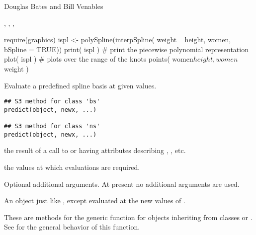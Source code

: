 %
\begin{Author}\relax
Douglas Bates and Bill Venables
\end{Author}
%
\begin{SeeAlso}\relax
{},
,
,
\end{SeeAlso}
%
\begin{Examples}
\begin{ExampleCode}
require(graphics)
ispl <- polySpline(interpSpline( weight ~ height,  women, bSpline = TRUE))
print( ispl )   # print the piecewise polynomial representation
plot( ispl )    # plots over the range of the knots
points( women$height, women$weight )
\end{ExampleCode}
\end{Examples}
%
\begin{Description}\relax
Evaluate a predefined spline basis at given values.
\end{Description}
%
\begin{Usage}
\begin{verbatim}
## S3 method for class 'bs'
predict(object, newx, ...)

## S3 method for class 'ns'
predict(object, newx, ...)
\end{verbatim}
\end{Usage}
%
\begin{Arguments}
\begin{ldescription}
\item[\code{object}] the result of a call to  or
 having attributes describing ,
, etc.
\item[\code{newx}] the  values at which evaluations are required.
\item[\code{...}] Optional additional arguments.  At present no additional
arguments are used.
\end{ldescription}
\end{Arguments}
%
\begin{Value}
An object just like , except evaluated at the new values
of .

These are methods for the generic function  for
objects inheriting from classes  or .  See
 for the general behavior of this function.
\end{Value}
